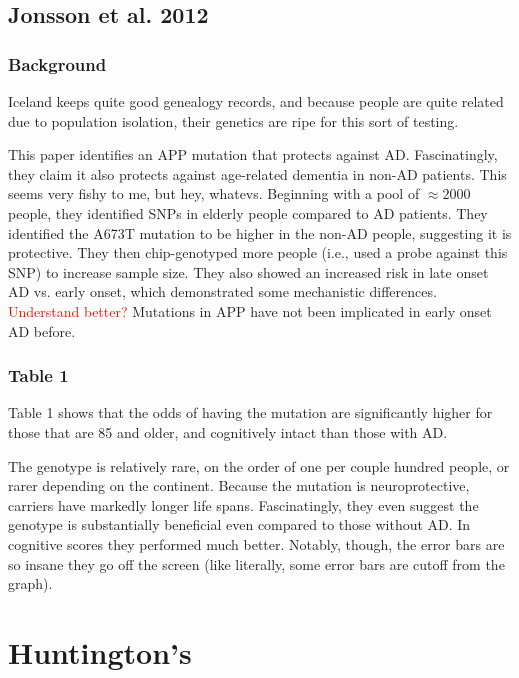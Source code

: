  \subsection*{Jonsson et al. 2012}

 \subsubsection*{Background}

 Iceland keeps quite good genealogy records, and because people are quite related due to population isolation, their genetics are ripe for this sort of testing.\newline

 This paper identifies an APP mutation that protects against AD. Fascinatingly, they claim it also protects against age-related dementia in non-AD patients. This seems very fishy to me, but hey, whatevs. Beginning with a pool of $\approx 2000$ people, they identified SNPs in elderly people compared to AD patients. They identified the A673T mutation to be higher in the non-AD people, suggesting it is protective. They then chip-genotyped more people (i.e., used a probe against this SNP) to increase sample size. They also showed an increased risk in late onset AD vs. early onset, which demonstrated some mechanistic differences. \textcolor{red}{Understand better?} Mutations in APP have not been implicated in early onset AD before. \newline

 \subsubsection*{Table 1}

 Table 1 shows that the odds of having the mutation are significantly higher for those that are 85 and older, and cognitively intact than those with AD.\newline

 The genotype is relatively rare, on the order of one per couple hundred people, or rarer depending on the continent. Because the mutation is neuroprotective, carriers have markedly longer life spans. Fascinatingly, they even suggest the genotype is substantially beneficial even compared to those without AD. In cognitive scores they performed much better. Notably, though, the error bars are so insane they go off the screen (like literally, some error bars are cutoff from the graph).\newline

 \section*{Huntington's}

